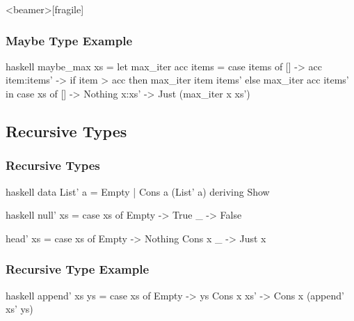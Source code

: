 \documentclass[dvipsnames]{beamer}
\theoremstyle{plain}
\begin{document}
\begin{frame}<beamer>[fragile]
  \frametitle{Maybe Type Example}

  \begin{example}
    \begin{pygments}{haskell}
maybe_max xs =
    let
       max_iter acc items =
           case items of
             [] -> acc
             item:items' -> if item > acc
                            then max_iter item items'
                            else max_iter acc items'
    in
        case xs of
          [] -> Nothing
          x:xs' -> Just (max_iter x xs')
    \end{pygments}
  \end{example}
\end{frame}

\subsection{Recursive Types}

\begin{frame}[fragile]
  \frametitle{Recursive Types}

  \begin{example}[Haskell]
    \begin{pygments}{haskell}
data List' a = Empty | Cons a (List' a)
               deriving Show
    \end{pygments}

    \pause
    \begin{pygments}{haskell}
null' xs =
    case xs of
      Empty -> True
      _ -> False

head' xs =
    case xs of
      Empty -> Nothing
      Cons x _ -> Just x
    \end{pygments}
  \end{example}
\end{frame}

\begin{frame}[fragile]
  \frametitle{Recursive Type Example}

  \begin{example}
    \pause
    \begin{pygments}{haskell}
append' xs ys =
    case xs of
      Empty -> ys
      Cons x xs' -> Cons x (append' xs' ys)
    \end{pygments}
  \end{example}
\end{frame}
\end{document}
